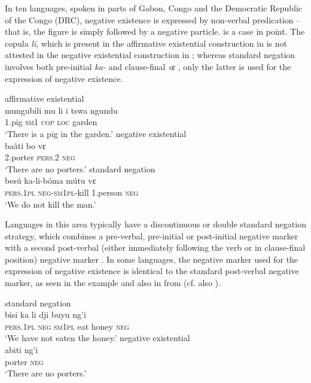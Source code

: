 \documentclass[output=paper,draft,draftmode,colorlinks,citecolor=brown]{langscibook}
\begin{document}
%
In ten languages, spoken in parts of Gabon, Congo and the Democratic
Republic of the Congo (DRC), negative existence is expressed by non-verbal
predication -- that is, the figure is simply followed by a negative particle.
 is a case in point.  The copula \textit{li}, which is present in
the affirmative existential construction in  is not
attested in the negative existential construction in ; whereas standard negation involves both pre-initial \textit{ka-} and
clause-final \textit{vɛ} , only the latter is used for
the expression of negative existence.  
%

\ea\label{ex:duma-pig-porter-kill} 

\ea\label{ex:duma-pig} affirmative existential \citep[148]{Adam1954}\\
\gll mungubili mu li i {tswa ngundu}\\ 
1.pig \textsc{sm1} \textsc{cop} \textsc{loc} garden\\ 
\glt	`There is a pig in the garden.'
\ex\label{ex:duma-porter} negative existential \citep[148]{Adam1954}\\
\gll
ba{\~a}ti bo vɛ\\ 2.porter \textsc{pers}.2 \textsc{neg}\\
\glt 	`There are
no porters.'
\ex\label{ex:duma-kill} standard negation
\citep[144]{Mickala1988}\\
\gll besú ka-li-b{\'o}ma mútu vɛ\\
\textsc{pers.1pl} \textsc{neg-sm1pl}-kill 1.person \textsc{neg}\\
\glt 	`We
do not kill the man.'
\z
\z


%
Languages in this area typically have a
discontinuous or double standard negation strategy, which combines a
pre-verbal, pre-initial or post-initial negative marker with a second
post-verbal (either immediately following the verb or in clause-final
position) negative marker \citep{DevosAuwera2013}. In some languages, the
negative marker used for the expression of negative existence is identical
to the standard post-verbal negative marker, as seen in the 
example  and also in
 from  (cf. also
).

\newpage
\ea\label{ex:nduumo-honey-porter}
 \ea standard
negation\\
\gll bisi ka li dji buyu ng'i\\ \textsc{pers.1pl} \textsc{neg}
\textsc{sm1pl} eat honey \textsc{neg}\\
\glt `We have not eaten the honey.'
\ex negative existential\\
\gll abiti ng'i\\ porter \textsc{neg}\\
\glt
`There are no porters.'
\z
\z
\end{document}
